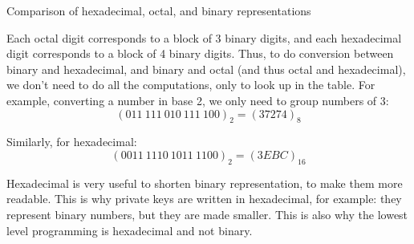 \documentclass[a4paper]{article}
\begin{document}
\begin{parag}{Comparison of hexadecimal, octal, and binary representations}
    

    Each octal digit corresponds to a block of 3 binary digits, and each hexadecimal digit corresponds to a block of 4 binary digits. Thus, to do conversion between binary and hexadecimal, and binary and octal (and thus octal and hexadecimal), we don't need to do all the computations, only to look up in the table. For example, converting a number in base 2, we only need to group numbers of 3:
    \[\left(011\ 111\ 010\ 111\ 100\right)_2 = \left(37274\right)_8\]

    Similarly, for hexadecimal:  
    \[\left(0011\ 1110\ 1011\ 1100\right)_2 = \left(3EBC\right)_{16}\]
    

    Hexadecimal is very useful to shorten binary representation, to make them more readable. This is why private keys are written in hexadecimal, for example: they represent binary numbers, but they are made smaller. This is also why the lowest level programming is hexadecimal and not binary.
\end{parag}
\end{document}
